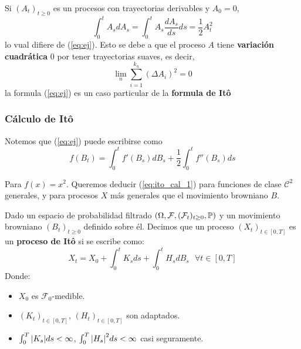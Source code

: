 \begin{remark}
        Si $(A_t)_{t \ge 0}$ es un procesos con trayectorias derivables y $A_0 = 0$, 
        \begin{equation*}
                \int_{0}^{t} A_s dA_s = \int_{0}^{t} A_s \frac{dA_s}{ds} ds = \frac{1}{2} A^2_t
        \end{equation*}
        lo vual difiere de (\ref{eq:ej}). Esto se debe a que el proceso $A$ tiene \textbf{variación 
        cuadrática} $0$ por tener trayectorias suaves, es decir, 
        \begin{equation*}
                \lim_{n} \sum_{i=1}^{k_n} (\Delta A_i)^2 = 0
        \end{equation*}
        la formula (\ref{eq:ej}) es un caso particular de la \textbf{formula de It\^{o}}
\end{remark}

\subsubsection{Cálculo de It\^{o}}

Notemos que (\ref{eq:ej}) puede escribirse como
\begin{equation*}
        \label{eq:ito_cal_1}
        \tag{**}
        f(B_t) = \int_{0}^t f'(B_s) dB_s + \frac{1}{2} \int_{0}^{t} f''(B_s) ds
\end{equation*}

Para $f(x) = x^2$. Queremos deducir (\ref{eq:ito_cal_1}) para funciones de clase $\mathcal{C}^2$ generales, 
y para procesos $X$ más generales que el movimiento browniano $B$. 

\begin{definition}[Proceso de It\^{o}]
        Dado un espacio de probabilidad filtrado $(\Omega, \mathcal{F}, (\mathcal{F}_t)_{t \geq 0}, \P)$ y 
        un movimiento browniano $(B_t)_{t \ge 0}$ definido sobre él. Decimos
        que un proceso $(X_t)_{t \in [0,T]}$ es un \textbf{proceso de It\^{o}} si se escribe como:
        \begin{equation*}
                \label{eq:ito_cal_2}
                \tag{***}
        X_t = X_0 + \int_{0}^{t} K_s ds + \int_{0}^{t} H_s dB_s ~ ~ ~ \forall t \in [0,T]
        \end{equation*}
        Donde:
        \begin{itemize}
                        \item $X_0$ es $\mathcal{F}_0$-medible. 
                        \item $(K_t)_{t \in [0,T]}$, $(H_t)_{t \in [0,T]}$ son adaptados. 
                        \item $\int_{0}^{T} \abs{K_s} ds < \infty$, $\int_{0}^{T} \abs{H_s}^2 ds < \infty$ 
                                casi seguramente.
        \end{itemize}
\end{definition}

